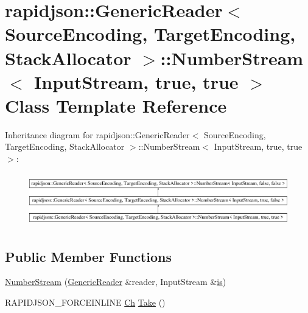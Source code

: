 \hypertarget{classrapidjson_1_1_generic_reader_1_1_number_stream_3_01_input_stream_00_01true_00_01true_01_4}{}\section{rapidjson\+::Generic\+Reader$<$ Source\+Encoding, Target\+Encoding, Stack\+Allocator $>$\+::Number\+Stream$<$ Input\+Stream, true, true $>$ Class Template Reference}
\label{classrapidjson_1_1_generic_reader_1_1_number_stream_3_01_input_stream_00_01true_00_01true_01_4}
Inheritance diagram for rapidjson\+::Generic\+Reader$<$ Source\+Encoding, Target\+Encoding, Stack\+Allocator $>$\+::Number\+Stream$<$ Input\+Stream, true, true $>$\+:\begin{figure}[H]
\begin{center}
\leavevmode
\includegraphics[height=2.326870cm]{classrapidjson_1_1_generic_reader_1_1_number_stream_3_01_input_stream_00_01true_00_01true_01_4}
\end{center}
\end{figure}
\subsection*{Public Member Functions}
\begin{DoxyCompactItemize}
\item 
\mbox{\hyperlink{classrapidjson_1_1_generic_reader_1_1_number_stream_3_01_input_stream_00_01true_00_01true_01_4_ac2f81ab96b4d0ee505d19d8f53e50b19}{Number\+Stream}} (\mbox{\hyperlink{classrapidjson_1_1_generic_reader}{Generic\+Reader}} \&reader, Input\+Stream \&\mbox{\hyperlink{classrapidjson_1_1_generic_reader_1_1_number_stream_3_01_input_stream_00_01false_00_01false_01_4_a89e9acf3bfcc7992f0122383e2c6349e}{is}})
\item 
R\+A\+P\+I\+D\+J\+S\+O\+N\+\_\+\+F\+O\+R\+C\+E\+I\+N\+L\+I\+NE \mbox{\hyperlink{classrapidjson_1_1_generic_reader_1_1_number_stream_3_01_input_stream_00_01false_00_01false_01_4_a2a945ef08d04099027c32f72821a12c0}{Ch}} \mbox{\hyperlink{classrapidjson_1_1_generic_reader_1_1_number_stream_3_01_input_stream_00_01true_00_01true_01_4_add30b0ff419fb8616d33f0d3fb71d32d}{Take}} ()
\end{DoxyCompactItemize}
